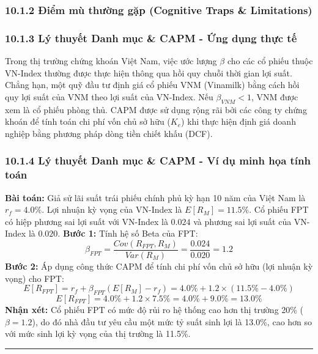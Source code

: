 \documentclass[
]{article}
\begin{document}
\subsubsection{10.1.2 Điểm mù thường gặp (Cognitive Traps \&
Limitations)}\label{ux111iux1ec3m-muxf9-thux1b0ux1eddng-gux1eb7p-cognitive-traps-limitations-77}

\subsubsection{10.1.3 Lý thuyết Danh mục \& CAPM - Ứng dụng thực
tế}\label{luxfd-thuyux1ebft-danh-mux1ee5c-capm---ux1ee9ng-dux1ee5ng-thux1ef1c-tux1ebf}

Trong thị trường chứng khoán Việt Nam, việc ước lượng \(\beta\) cho các
cổ phiếu thuộc VN-Index thường được thực hiện thông qua hồi quy chuỗi
thời gian lợi suất. Chẳng hạn, một quỹ đầu tư định giá cổ phiếu VNM
(Vinamilk) bằng cách hồi quy lợi suất của VNM theo lợi suất của
VN-Index. Nếu \(\beta_{VNM} < 1\), VNM được xem là cổ phiếu phòng thủ.
CAPM được sử dụng rộng rãi bởi các công ty chứng khoán để tính toán chi
phí vốn chủ sở hữu (\(K_e\)) khi thực hiện định giá doanh nghiệp bằng
phương pháp dòng tiền chiết khấu (DCF).

\subsubsection{10.1.4 Lý thuyết Danh mục \& CAPM - Ví dụ minh họa tính
toán}\label{luxfd-thuyux1ebft-danh-mux1ee5c-capm---vuxed-dux1ee5-minh-hux1ecda-tuxednh-touxe1n}

\textbf{Bài toán:} Giả sử lãi suất trái phiếu chính phủ kỳ hạn 10 năm
của Việt Nam là \(r_f = 4.0\%\). Lợi nhuận kỳ vọng của VN-Index là
\(E[R_M] = 11.5\%\). Cổ phiếu FPT có hiệp phương sai lợi suất với
VN-Index là \(0.024\) và phương sai lợi suất của VN-Index là \(0.020\).
\textbf{Bước 1:} Tính hệ số Beta của FPT:
\[ \beta_{FPT} = \frac{Cov(R_{FPT}, R_M)}{Var(R_M)} = \frac{0.024}{0.020} = 1.2 \]
\textbf{Bước 2:} Áp dụng công thức CAPM để tính chi phí vốn chủ sở hữu
(lợi nhuận kỳ vọng) cho FPT:
\[ E[R_{FPT}] = r_f + \beta_{FPT} (E[R_M] - r_f) = 4.0\% + 1.2 \times (11.5\% - 4.0\%) \]
\[ E[R_{FPT}] = 4.0\% + 1.2 \times 7.5\% = 4.0\% + 9.0\% = 13.0\% \]
\textbf{Nhận xét:} Cổ phiếu FPT có mức độ rủi ro hệ thống cao hơn thị
trường 20\% (\(\beta = 1.2\)), do đó nhà đầu tư yêu cầu một mức tỷ suất
sinh lợi là 13.0\%, cao hơn so với mức sinh lợi kỳ vọng của thị trường
là 11.5\%.

\begin{center}\rule{0.5\linewidth}{0.5pt}\end{center}
\end{document}

